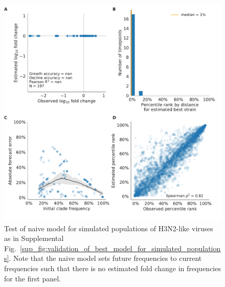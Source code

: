 \begin{figure}[H]
  \begin{center}
  \includegraphics[width=\textwidth]{figures/validation_figure_simulated-simulated_sample_3_test_tree-naive.pdf}
  \caption{
  Test of naive model for simulated populations of H3N2-like viruses as in Supplemental Fig.~\ref{sup_fig:validation_of_best_model_for_simulated_populations}.
  Note that the naive model sets future frequencies to current frequencies such that there is no estimated fold change in frequencies for the first panel.
  }
  \label{sup_fig:test_of_naive_model_for_simulated_populations}
  \end{center}
\end{figure}

